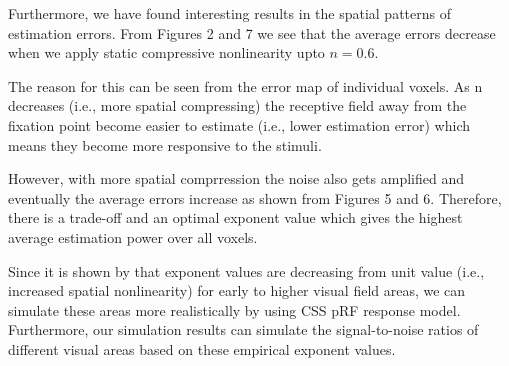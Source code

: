 \documentclass[review]{elsarticle}
\begin{document}
Furthermore, we have found interesting results in the spatial patterns of estimation errors. From Figures 2 and 7 we see that the average errors decrease when we apply static compressive nonlinearity upto $n=0.6$.

The reason for this can be seen from the error map of individual voxels. As n decreases (i.e., more spatial compressing) the receptive field away from the fixation point become easier to estimate (i.e., lower estimation error) which means they become more responsive to the stimuli.

However, with more spatial comprression the noise also gets amplified and eventually the average errors increase as shown from Figures 5 and 6. Therefore, there is a trade-off and an optimal exponent value which gives the highest average estimation power over all voxels.

Since it is shown by \cite{Kay2013} that exponent values are decreasing from unit value (i.e., increased spatial nonlinearity) for early to higher visual field areas, we can simulate these areas more realistically by using CSS pRF response model. Furthermore, our simulation results can simulate the signal-to-noise ratios of different visual areas based on these empirical exponent values.

\end{document}
